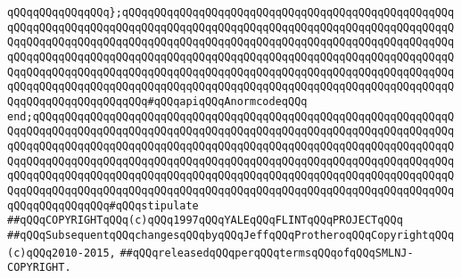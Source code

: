 \newline
\verb|qQQqqQQqqQQqqQQq};qQQqqQQqqQQqqQQqqQQqqQQqqQQqqQQqqQQqqQQqqQQqqQQqqQQqqQQqqQQqqQQqqQQqqQQqqQQqqQQqqQQqqQQqqQQqqQQqqQQqqQQqqQQqqQQqqQQqqQQqqQQqqQQqqQQqqQQqqQQqqQQqqQQqqQQqqQQqqQQqqQQqqQQqqQQqqQQqqQQqqQQqqQQqqQQqqQQqqQQqqQQqqQQqqQQqqQQqqQQqqQQqqQQqqQQqqQQqqQQqqQQqqQQqqQQqqQQqqQQqqQQqqQQqqQQqqQQqqQQqqQQqqQQqqQQqqQQqqQQqqQQqqQQqqQQqqQQqqQQqqQQqqQQqqQQqqQQqqQQqqQQqqQQqqQQqqQQqqQQqqQQqqQQqqQQqqQQqqQQqqQQqqQQqqQQqqQQqqQQqqQQqqQQqqQQqqQQqqQQqqQQq#qQQqapiqQQqAnormcodeqQQq|\newline
\verb|end;qQQqqQQqqQQqqQQqqQQqqQQqqQQqqQQqqQQqqQQqqQQqqQQqqQQqqQQqqQQqqQQqqQQqqQQqqQQqqQQqqQQqqQQqqQQqqQQqqQQqqQQqqQQqqQQqqQQqqQQqqQQqqQQqqQQqqQQqqQQqqQQqqQQqqQQqqQQqqQQqqQQqqQQqqQQqqQQqqQQqqQQqqQQqqQQqqQQqqQQqqQQqqQQqqQQqqQQqqQQqqQQqqQQqqQQqqQQqqQQqqQQqqQQqqQQqqQQqqQQqqQQqqQQqqQQqqQQqqQQqqQQqqQQqqQQqqQQqqQQqqQQqqQQqqQQqqQQqqQQqqQQqqQQqqQQqqQQqqQQqqQQqqQQqqQQqqQQqqQQqqQQqqQQqqQQqqQQqqQQqqQQqqQQqqQQqqQQqqQQqqQQqqQQqqQQqqQQqqQQqqQQqqQQqqQQq#qQQqstipulate|\newline
\newline
\verb|##qQQqCOPYRIGHTqQQq(c)qQQq1997qQQqYALEqQQqFLINTqQQqPROJECTqQQq|\newline
\verb|##qQQqSubsequentqQQqchangesqQQqbyqQQqJeffqQQqProtheroqQQqCopyrightqQQq(c)qQQq2010-2015,|\newline
\verb|##qQQqreleasedqQQqperqQQqtermsqQQqofqQQqSMLNJ-COPYRIGHT.|\newline

